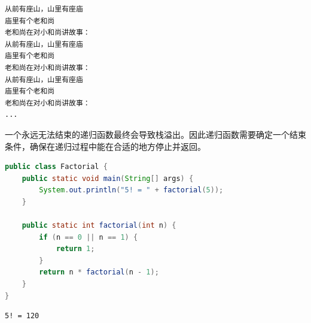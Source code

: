 \begin{tcolorbox}
	\begin{verbatim}
从前有座山，山里有座庙
庙里有个老和尚
老和尚在对小和尚讲故事：
从前有座山，山里有座庙
庙里有个老和尚
老和尚在对小和尚讲故事：
从前有座山，山里有座庙
庙里有个老和尚
老和尚在对小和尚讲故事：
...
	\end{verbatim}
\end{tcolorbox}

一个永远无法结束的递归函数最终会导致栈溢出。因此递归函数需要确定一个结束条件，确保在递归过程中能在合适的地方停止并返回。\\


\begin{lstlisting}[language=Java]
public class Factorial {
	public static void main(String[] args) {
		System.out.println("5! = " + factorial(5));
	}

	public static int factorial(int n) {
		if (n == 0 || n == 1) {
			return 1;
		}
		return n * factorial(n - 1);
	}
}
\end{lstlisting}

\begin{tcolorbox}
	\begin{verbatim}
5! = 120
	\end{verbatim}
\end{tcolorbox}

